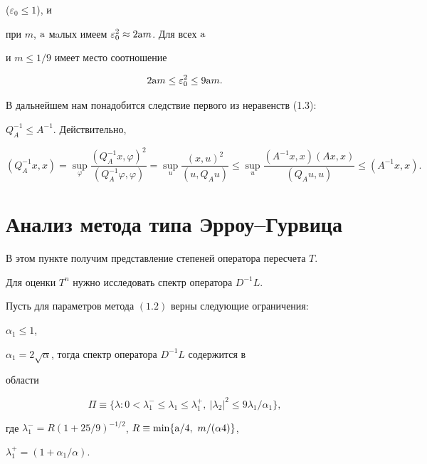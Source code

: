 ($\varepsilon_0\le1$), и 


при $m$, $\mathrm a$ мaлых имеем $\varepsilon^2_0\approx2\mathrm a m$. Для всех $\mathrm a$ 


и $m\le1/9$ имеет место соотношение 


$$ 


2\A m\le\varepsilon^2_0\le9\A m. 


$$ 


 


В дальнейшем нам понадобится следствие первого из неравенств (1.3): 


$Q^{-1}_A\le A^{-1}$. Действительно, 


\begin{equation} 


(Q^{-1}_A x,x)=\sup_\varphi 


\frac{(Q^{-1}_A x,\varphi)^2}{(Q^{-1}_A\varphi,\varphi)}=\sup_u 


\frac{(x,u)^2}{(u,Q_A u)}\le\sup_u 


\frac{(A^{-1}x,x)(Ax,x)}{(Q_A u,u)}\le(A^{-1}x,x). 


\end{equation} 


 


\section{Анализ метода типа Эрроу--Гурвица} 


 


В этом пункте получим представление степеней оператора пересчета $T$. 


Для оценки $T^n$ нужно исследовать спектр оператора $D^{-1}L$. 


 


\begin{thm} 


Пусть для параметров метода $(1.2)$ верны следующие ограничения${:}$ 


$\alpha_1\le1$, 


$\alpha_1=2\sqrt{\alpha}$, тогда спектр оператора $D^{-1}L$ содержится в 


области 


\begin{equation} 


\Pi\equiv\{\lambda:0<\lambda^-_1\le\lambda_1\le\lambda^+_1, 


\ |\lambda_2|^2\le9\lambda_1/\alpha_1\}, 


\end{equation} 


где $\lambda^-_1=R(1+25/9)^{-1/2}$, $R\equiv\min\{\A/4,\ m/(\alpha4)\}$, 


$\lambda^+_1=(1+\alpha_1/\alpha)$. 


\end{thm} 


